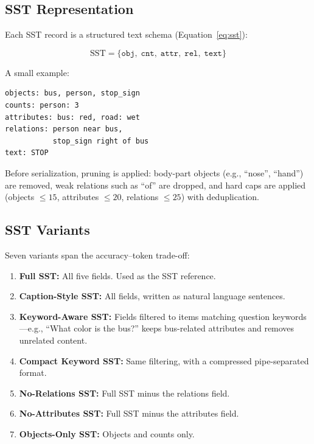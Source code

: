 \documentclass[10pt,twocolumn]{article}
\begin{document}
\subsection{SST Representation}

Each SST record is a structured text schema (Equation~\ref{eq:sst}):

\begin{equation}
\text{SST} = \{\texttt{obj},\;\texttt{cnt},\;\texttt{attr},\;\texttt{rel},\;\texttt{text}\}
\label{eq:sst}
\end{equation}

\noindent A small example:

\begin{lstlisting}
objects: bus, person, stop_sign
counts: person: 3
attributes: bus: red, road: wet
relations: person near bus,
           stop_sign right of bus
text: STOP
\end{lstlisting}

Before serialization, pruning is applied: body-part objects (e.g., ``nose'', ``hand'') are removed, weak relations such as ``of'' are dropped, and hard caps are applied (objects $\leq15$, attributes $\leq20$, relations $\leq25$) with deduplication.

\subsection{SST Variants}

Seven variants span the accuracy--token trade-off:

\begin{enumerate}
  \item \textbf{Full SST:} All five fields. Used as the SST reference.
  \item \textbf{Caption-Style SST:} All fields, written as natural language sentences.
  \item \textbf{Keyword-Aware SST:} Fields filtered to items matching question keywords---e.g., ``What color is the bus?'' keeps bus-related attributes and removes unrelated content.
  \item \textbf{Compact Keyword SST:} Same filtering, with a compressed pipe-separated format.
  \item \textbf{No-Relations SST:} Full SST minus the relations field.
  \item \textbf{No-Attributes SST:} Full SST minus the attributes field.
  \item \textbf{Objects-Only SST:} Objects and counts only.
\end{enumerate}
\end{document}
